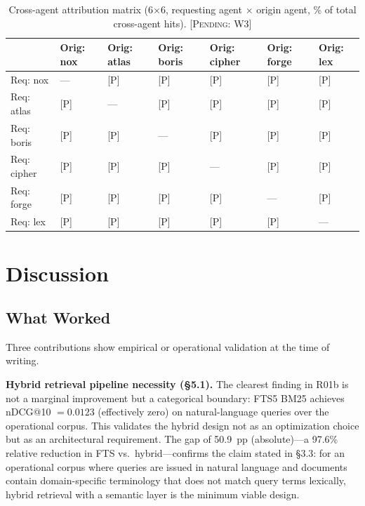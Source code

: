 \documentclass{article}
\begin{document}
\begin{table}[t]
  \caption{Cross-agent attribution matrix (6$\times$6, requesting agent $\times$ origin
    agent, \% of total cross-agent hits). \textsc{[Pending: W3]}}
  \label{tab:attribution}
  \centering
  \begin{tabular}{lllllll}
    \toprule
           & Orig: nox & Orig: atlas & Orig: boris & Orig: cipher & Orig: forge & Orig: lex \\
    \midrule
    Req: nox    & ---    & {[}P{]} & {[}P{]} & {[}P{]} & {[}P{]} & {[}P{]} \\
    Req: atlas  & {[}P{]} & ---    & {[}P{]} & {[}P{]} & {[}P{]} & {[}P{]} \\
    Req: boris  & {[}P{]} & {[}P{]} & ---    & {[}P{]} & {[}P{]} & {[}P{]} \\
    Req: cipher & {[}P{]} & {[}P{]} & {[}P{]} & ---    & {[}P{]} & {[}P{]} \\
    Req: forge  & {[}P{]} & {[}P{]} & {[}P{]} & {[}P{]} & ---    & {[}P{]} \\
    Req: lex    & {[}P{]} & {[}P{]} & {[}P{]} & {[}P{]} & {[}P{]} & ---    \\
    \bottomrule
  \end{tabular}
\end{table}

\section{Discussion}

\subsection{What Worked}

Three contributions show empirical or operational validation at the time of writing.

\textbf{Hybrid retrieval pipeline necessity (\S5.1).} The clearest finding in R01b is not
a marginal improvement but a categorical boundary: FTS5 BM25 achieves nDCG@10 $= 0.0123$
(effectively zero) on natural-language queries over the operational corpus. This validates
the hybrid design not as an optimization choice but as an architectural requirement. The
gap of 50.9~pp (absolute)---a 97.6\% relative reduction in FTS vs.\ hybrid---confirms the
claim stated in \S3.3: for an operational corpus where queries are issued in natural
language and documents contain domain-specific terminology that does not match query terms
lexically, hybrid retrieval with a semantic layer is the minimum viable design.
\end{document}
